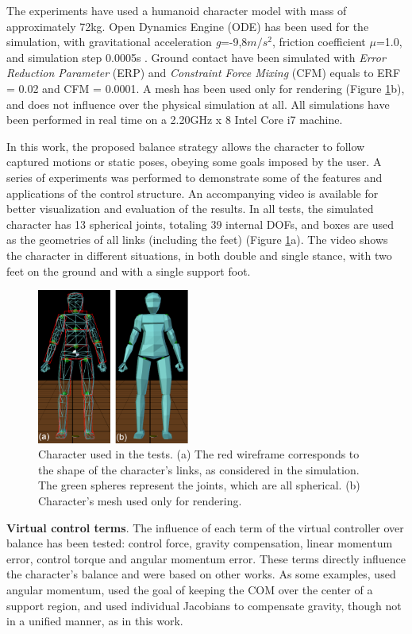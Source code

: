 \documentclass[tog]{acmsiggraph}
\begin{document}
The experiments have used a humanoid character model with mass of approximately 72kg. Open Dynamics Engine (ODE) \cite{bib:ODE} has been used for the
simulation, with gravitational acceleration \textit{g}=-9,8$m/s^{2}$, friction coefficient $\mu$=1.0, and simulation step 0.0005s \cite{bib:Coros10}. Ground contact have been
simulated with \textit{Error Reduction Parameter} (ERP) and \textit{Constraint Force Mixing} (CFM) equals to ERF = 0.02 and CFM = 0.0001. A mesh has been used only
for rendering (Figure \ref{fig:modeloutilizado}b), and does not influence over the physical simulation at all. All simulations have been performed in real time on a 
2.20GHz x 8 Intel Core i7 machine.

In this work, the proposed balance strategy allows the character to follow captured motions or static poses, obeying some goals imposed by the
user. A series of experiments was performed to demonstrate some of the features and applications of the control structure. An accompanying video
is available for better visualization and evaluation of the results. In all tests, the simulated character has 13 spherical joints, totaling 39 
internal DOFs, and boxes are used as the geometries of all links (including the feet) (Figure \ref{fig:modeloutilizado}a). The video shows the character in different
situations, in both double and single stance, with two feet on the ground and with a single support foot.


\begin{figure}[tbh]
\centering
\includegraphics[width=5cm]{images/modelo-utilizado.png}
\caption{Character used in the tests. (a) The red wireframe corresponds to the shape
of the character’s links, as considered in the simulation. The green spheres represent the joints, which are all spherical.
(b) Character's mesh used only for rendering.}
\label{fig:modeloutilizado}
\end{figure}

\noindent \textbf{Virtual control terms}. The influence of each term of the virtual controller over balance has been tested: control force, gravity compensation,
linear momentum error, control torque and angular momentum error. These terms directly influence the character's balance and were based on other
works. As some examples, \cite{bib:Macchietto09} used angular momentum, \cite{bib:Geijtenbeek12} \cite{bib:Zordan02} used the goal of keeping 
the COM over the center of a support region, and \cite{bib:Coros10} used individual Jacobians to compensate gravity, though not in a unified
manner, as in this work.
\end{document}
